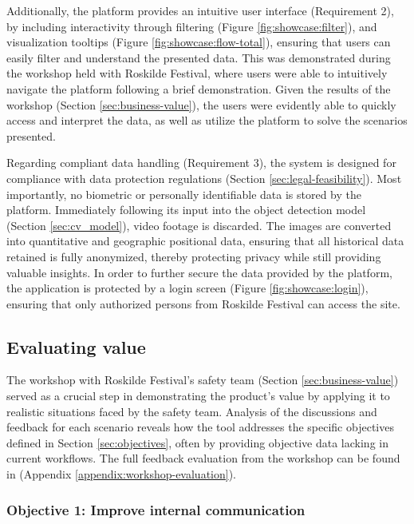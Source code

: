 Additionally, the platform provides an intuitive user interface (Requirement 2), by including interactivity through filtering (Figure \ref{fig:showcase:filter}), and visualization tooltips (Figure \ref{fig:showcase:flow-total}), ensuring that users can easily filter and understand the presented data. This was demonstrated during the workshop held with Roskilde Festival, where users were able to intuitively navigate the platform following a brief demonstration. Given the results of the workshop (Section \ref{sec:business-value}), the users were evidently able to quickly access and interpret the data, as well as utilize the platform to solve the scenarios presented.

Regarding compliant data handling (Requirement 3), the system is designed for compliance with data protection regulations (Section \ref{sec:legal-feasibility}). Most importantly, no biometric or personally identifiable data is stored by the platform. Immediately following its input into the object detection model (Section \ref{sec:cv_model}), video footage is discarded. The images are converted into quantitative and geographic positional data, ensuring that all historical data retained is fully anonymized, thereby protecting privacy while still providing valuable insights. In order to further secure the data provided by the platform, the application is protected by a login screen (Figure \ref{fig:showcase:login}), ensuring that only authorized persons from Roskilde Festival can access the site.

\subsection{Evaluating value}

The workshop with Roskilde Festival's safety team (Section \ref{sec:business-value}) served as a crucial step in demonstrating the product's value by applying it to realistic situations faced by the safety team. Analysis of the discussions and feedback for each scenario reveals how the tool addresses the specific objectives defined in Section \ref{sec:objectives}, often by providing objective data lacking in current workflows. The full feedback evaluation from the workshop can be found in (Appendix \ref{appendix:workshop-evaluation}).

\subsubsection{Objective 1: Improve internal communication}


